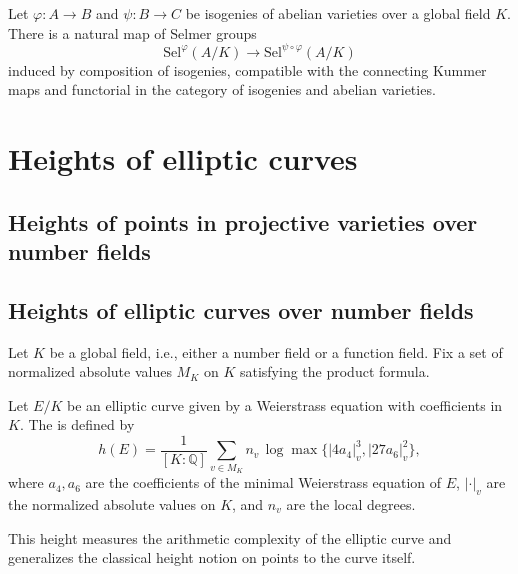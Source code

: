 \begin{corollary}
Let $\varphi: A \to B$ and $\psi: B \to C$ be isogenies of abelian varieties over a global field $K$.  
There is a natural map of Selmer groups
$$\mathrm{Sel}^\varphi(A/K) \to \mathrm{Sel}^{\psi \circ \varphi}(A/K)$$
induced by composition of isogenies, compatible with the connecting Kummer maps and functorial in the category of isogenies and abelian varieties.
\end{corollary}




\section{Heights of elliptic curves}

\subsection{Heights of points in projective varieties over number fields}




\subsection{Heights of elliptic curves over number fields}



\begin{definition}
    Let $K$ be a global field, i.e., either a number field or a function field. Fix a set of normalized absolute values $M_K$ on $K$ satisfying the product formula.

    Let $E/K$ be an elliptic curve given by a Weierstrass equation with coefficients in $K$. The  is defined by
    $$h(E) = \frac{1}{[K:\mathbb{Q}]} \sum_{v \in M_K} n_v \, \log \max \big\{ |4a_4|_v^3, |27a_6|_v^2 \big\},$$
    where $a_4, a_6$ are the coefficients of the minimal Weierstrass equation of $E$, $|\cdot|_v$ are the normalized absolute values on $K$, and $n_v$ are the local degrees.

    This height measures the arithmetic complexity of the elliptic curve and generalizes the classical height notion on points to the curve itself.
\end{definition}


